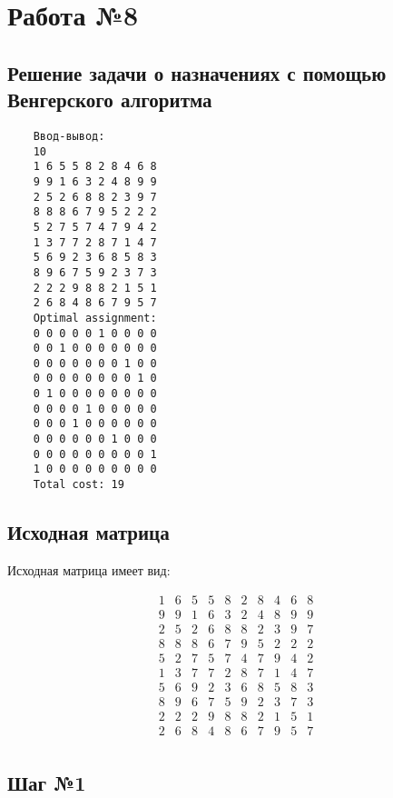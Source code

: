 \documentclass[17pt]{extarticle}
\begin{document}
\section*{Работа №8}
\subsection*{Решение задачи о назначениях с помощью Венгерского алгоритма}
\begin{verbatim}
    Ввод-вывод:
    10
    1 6 5 5 8 2 8 4 6 8
    9 9 1 6 3 2 4 8 9 9
    2 5 2 6 8 8 2 3 9 7
    8 8 8 6 7 9 5 2 2 2
    5 2 7 5 7 4 7 9 4 2
    1 3 7 7 2 8 7 1 4 7
    5 6 9 2 3 6 8 5 8 3
    8 9 6 7 5 9 2 3 7 3
    2 2 2 9 8 8 2 1 5 1
    2 6 8 4 8 6 7 9 5 7
    Optimal assignment:
    0 0 0 0 0 1 0 0 0 0
    0 0 1 0 0 0 0 0 0 0
    0 0 0 0 0 0 0 1 0 0
    0 0 0 0 0 0 0 0 1 0
    0 1 0 0 0 0 0 0 0 0
    0 0 0 0 1 0 0 0 0 0
    0 0 0 1 0 0 0 0 0 0
    0 0 0 0 0 0 1 0 0 0
    0 0 0 0 0 0 0 0 0 1
    1 0 0 0 0 0 0 0 0 0
    Total cost: 19
\end{verbatim}

\subsection*{Исходная матрица}

Исходная матрица имеет вид:

\[
    \begin{array}{*{10}{c}}
        1 & 6 & 5 & 5 & 8 & 2 & 8 & 4 & 6 & 8 \\
        9 & 9 & 1 & 6 & 3 & 2 & 4 & 8 & 9 & 9 \\
        2 & 5 & 2 & 6 & 8 & 8 & 2 & 3 & 9 & 7 \\
        8 & 8 & 8 & 6 & 7 & 9 & 5 & 2 & 2 & 2 \\
        5 & 2 & 7 & 5 & 7 & 4 & 7 & 9 & 4 & 2 \\
        1 & 3 & 7 & 7 & 2 & 8 & 7 & 1 & 4 & 7 \\
        5 & 6 & 9 & 2 & 3 & 6 & 8 & 5 & 8 & 3 \\
        8 & 9 & 6 & 7 & 5 & 9 & 2 & 3 & 7 & 3 \\
        2 & 2 & 2 & 9 & 8 & 8 & 2 & 1 & 5 & 1 \\
        2 & 6 & 8 & 4 & 8 & 6 & 7 & 9 & 5 & 7 \\
    \end{array}
\]

\subsection*{Шаг №1}
\end{document}
